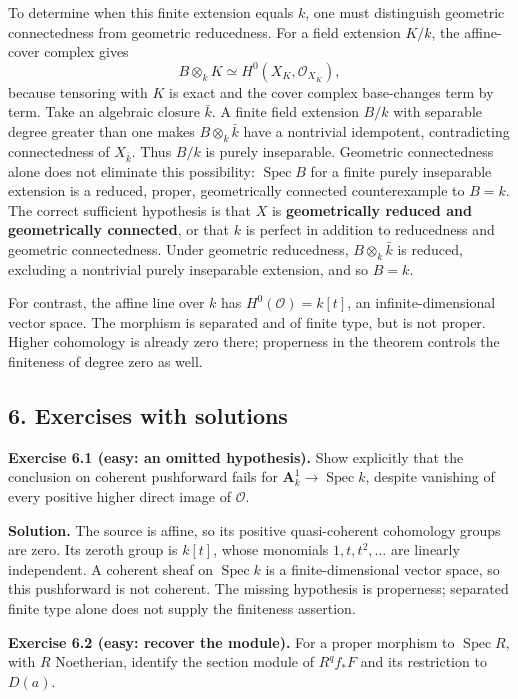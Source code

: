 \documentclass[11pt]{article}
\begin{document}
To determine when this finite extension equals \(k\), one must
distinguish geometric connectedness from geometric reducedness. For a
field extension \(K/k\), the affine-cover complex gives \[
B\otimes_k K\simeq H^0(X_K,\mathcal O_{X_K}),
\] because tensoring with \(K\) is exact and the cover complex
base-changes term by term. Take an algebraic closure \(\bar k\). A
finite field extension \(B/k\) with separable degree greater than one
makes \(B\otimes_k\bar k\) have a nontrivial idempotent, contradicting
connectedness of \(X_{\bar k}\). Thus \(B/k\) is purely inseparable.
Geometric connectedness alone does not eliminate this possibility:
\(\operatorname{Spec}B\) for a finite purely inseparable extension is a
reduced, proper, geometrically connected counterexample to \(B=k\). The
correct sufficient hypothesis is that \(X\) is \textbf{geometrically
reduced and geometrically connected}, or that \(k\) is perfect in
addition to reducedness and geometric connectedness. Under geometric
reducedness, \(B\otimes_k\bar k\) is reduced, excluding a nontrivial
purely inseparable extension, and so \(B=k\).

For contrast, the affine line over \(k\) has \(H^0(\mathcal O)=k[t]\),
an infinite-dimensional vector space. The morphism is separated and of
finite type, but is not proper. Higher cohomology is already zero there;
properness in the theorem controls the finiteness of degree zero as
well.

\subsection{6. Exercises with
solutions}\label{exercises-with-solutions-5}

\textbf{Exercise 6.1 (easy: an omitted hypothesis).} Show explicitly
that the conclusion on coherent pushforward fails for
\(\mathbf A_k^1\to\operatorname{Spec}k\), despite vanishing of every
positive higher direct image of \(\mathcal O\).

\textbf{Solution.} The source is affine, so its positive quasi-coherent
cohomology groups are zero. Its zeroth group is \(k[t]\), whose
monomials \(1,t,t^2,\ldots\) are linearly independent. A coherent sheaf
on \(\operatorname{Spec}k\) is a finite-dimensional vector space, so
this pushforward is not coherent. The missing hypothesis is properness;
separated finite type alone does not supply the finiteness assertion.

\textbf{Exercise 6.2 (easy: recover the module).} For a proper morphism
to \(\operatorname{Spec}R\), with \(R\) Noetherian, identify the section
module of \(R^qf_*F\) and its restriction to \(D(a)\).
\end{document}
